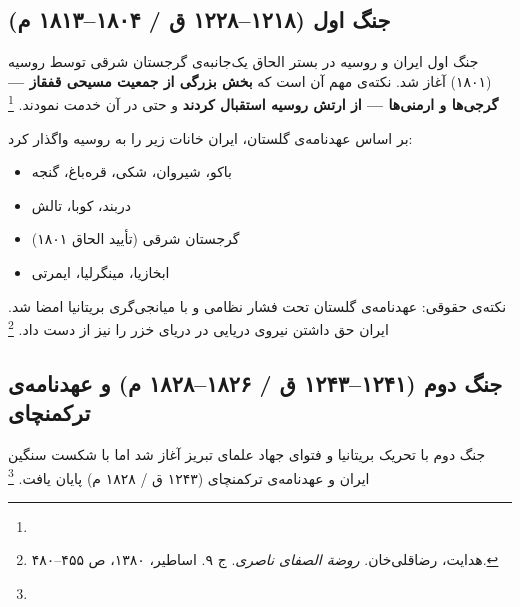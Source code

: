 \subsection{جنگ اول (۱۲۱۸–۱۲۲۸ ق / ۱۸۰۴–۱۸۱۳ م)}
\label{subsec:ch06-first-war}

جنگ اول ایران و روسیه در بستر الحاق یک‌جانبه‌ی گرجستان شرقی توسط روسیه (۱۸۰۱) آغاز شد. نکته‌ی مهم آن است که \textbf{بخش بزرگی از جمعیت مسیحی قفقاز — گرجی‌ها و ارمنی‌ها — از ارتش روسیه استقبال کردند} و حتی در آن خدمت نمودند.%
\footnote{}

\begin{tcolorbox}[legalbox, title={عهدنامه‌ی گلستان (۱۲۲۸ ق / ۱۸۱۳ م): پیامدهای ارضی}]
بر اساس عهدنامه‌ی گلستان، ایران خانات زیر را به روسیه واگذار کرد:
\begin{itemize}[nosep, rightmargin=1em]
  \item باکو، شیروان، شکی، قره‌باغ، گنجه
  \item دربند، کوبا، تالش
  \item گرجستان شرقی (تأیید الحاق ۱۸۰۱)
  \item ابخازیا، مینگرلیا، ایمرتی
\end{itemize}
\vspace{4pt}
نکته‌ی حقوقی: عهدنامه‌ی گلستان تحت فشار نظامی و با میانجی‌گری بریتانیا امضا شد. ایران حق داشتن نیروی دریایی در دریای خزر را نیز از دست داد.%
\footnote{هدایت، رضاقلی‌خان. \textit{روضة الصفای ناصری}. ج ۹. اساطیر، ۱۳۸۰، ص ۴۵۵--۴۸۰.}
\end{tcolorbox}

\subsection{جنگ دوم (۱۲۴۱–۱۲۴۳ ق / ۱۸۲۶–۱۸۲۸ م) و عهدنامه‌ی ترکمنچای}
\label{subsec:ch06-second-war}

جنگ دوم با تحریک بریتانیا و فتوای جهاد علمای تبریز آغاز شد اما با شکست سنگین ایران و عهدنامه‌ی ترکمنچای (۱۲۴۳ ق / ۱۸۲۸ م) پایان یافت.%
\footnote{}

